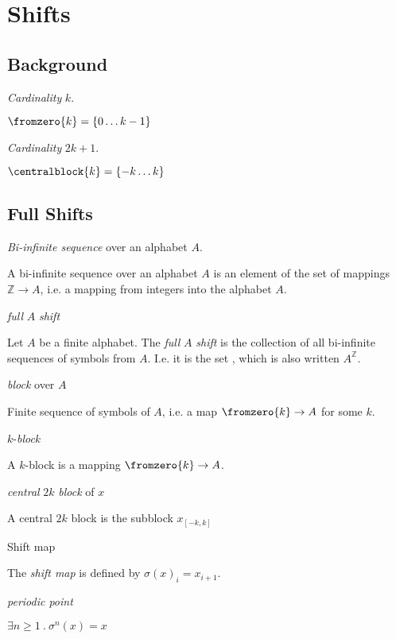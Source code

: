 \section{Shifts}

\subsection {Background}

\begdef
\textit{Cardinality} $k$.

$\fromzero{k} = \{ 0 \ldots k - 1 \}$
\edefi

\begdef
\textit{Cardinality} $2 k + 1$.

$\centralblock{k} = \{ -k \ldots k \}$
\edefi

\subsection{Full Shifts}

\begdef
\textit{Bi-infinite sequence} over an alphabet $A$.

A bi-infinite sequence over an alphabet $A$ is an element of the
set of mappings $\mathbb{Z} \rightarrow A$, i.e. a mapping from integers
into the alphabet $A$.
\edefi

\begdef
\textit{full} $A$ \textit{shift}

Let $A$ be a finite alphabet.
The \textit{full} $A$ \textit{shift} is the collection of all bi-infinite
sequences of symbols from $A$. I.e. it is the set ,
which is also written $A^{\mathbb{Z}}$.
\edefi

\begdef
\textit{block} over $A$

Finite sequence of symbols of $A$, i.e. a map $\fromzero{k}\rightarrow A$
for some $k$.
\edefi

\begdef
$k$-\textit{block}

A $k$-block is a mapping $\fromzero{k} \rightarrow A$.
\edefi

\begdef
\textit{central} $2 k$ \textit{block} of $x$

A central $2 k$ block is the subblock $x_{[-k,k]}$
\edefi

\begdef
Shift map 

The \textit{shift map} 
is defined by $\sigma(x)_i = x_{i+1}$.
\edefi

\begdef
\textit{periodic point}

$\exists n \geq 1\ .\ \sigma^n(x) = x$
\edefi

